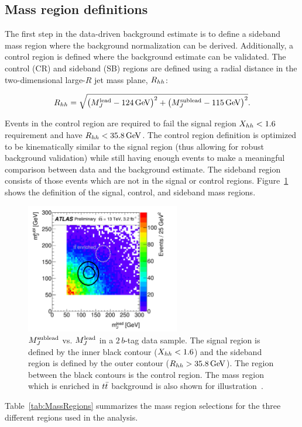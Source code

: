 \subsection{Mass region definitions}

The first step in the data-driven background estimate is to define a sideband mass region where the background normalization can be derived. Additionally, a control region is defined where the background estimate can be validated. The control (CR) and sideband (SB) regions are defined using a radial distance in the two-dimensional large-$R$ jet mass plane, $R_{hh}$:

\begin{equation}
\label{eqn:Rhh}
\Rhh = \sqrt{\left(M_{J}^{\rm lead} - 124 \GeV\right)^2 + \left(M_{J}^{\rm sublead} - 115 \GeV\right)^2}.
\end{equation}

Events in the control region are required to fail the signal region $X_{hh} < 1.6$ requirement and have $\Rhh < 35.8 \GeV$. The control region definition is optimized to be kinematically similar to the signal region (thus allowing for robust background validation) while still having enough events to make a meaningful comparison between data and the background estimate. The sideband region consists of those events which are not in the signal or control regions. Figure~\ref{fig:MassRegions} shows the definition of the signal, control, and sideband mass regions.
%
\begin{figure}[h!]
  \centering
  \captionsetup{justification=centering}

  \includegraphics[width=0.6\textwidth]{figures/MassRegions}
  \caption{$M_{J}^{\rm sublead}$ vs. $M_{J}^{\rm lead}$ in a $2\,b$-tag data sample. The signal region is defined by the inner black contour ($X_{hh} < 1.6$) and the sideband region is defined by the outer contour ($\Rhh > 35.8 \GeV$). The region between the black contours is the control region. The mass region which is enriched in $t\bar{t}$ background is also shown for illustration~\cite{4bconf}.}
  \label{fig:MassRegions}
\end{figure}
%
Table~\ref{tab:MassRegions} summarizes the mass region selections for the three different regions used in the analysis.

